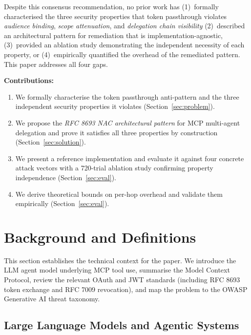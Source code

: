 \documentclass[journal]{IEEEtran}
\begin{document}
Despite this consensus recommendation, no prior work has (1)~formally
characterised the three security properties that token passthrough
violates \textit{audience binding}, \textit{scope attenuation}, and
\textit{delegation chain visibility} (2)~described an architectural pattern for
remediation that is implementation-agnostic, (3)~provided an ablation study
demonstrating the independent necessity of each property, or (4)~empirically
quantified the overhead of the remediated pattern. This paper addresses all four
gaps.

\textbf{Contributions:}
\begin{enumerate}
  \item We formally characterise the token passthrough anti-pattern and the three
        independent security properties it violates
        (Section~\ref{sec:problem}).
  \item We propose the \textit{RFC 8693 NAC architectural pattern} for MCP
        multi-agent delegation and prove it satisfies all three properties by
        construction (Section~\ref{sec:solution}).
  \item We present a reference implementation and evaluate it against four
        concrete attack vectors with a 720-trial ablation study confirming
        property independence (Section~\ref{sec:eval}).
  \item We derive theoretical bounds on per-hop overhead and validate them
        empirically (Section~\ref{sec:eval}).
\end{enumerate}

\section{Background and Definitions}
\label{sec:background}

This section establishes the technical context for the paper. We introduce the
LLM agent model underlying MCP tool use, summarise the Model Context Protocol,
review the relevant OAuth and JWT standards (including RFC 8693 token exchange
and RFC 7009 revocation), and map the problem to the OWASP Generative AI threat
taxonomy.

\subsection{Large Language Models and Agentic Systems}
\end{document}
